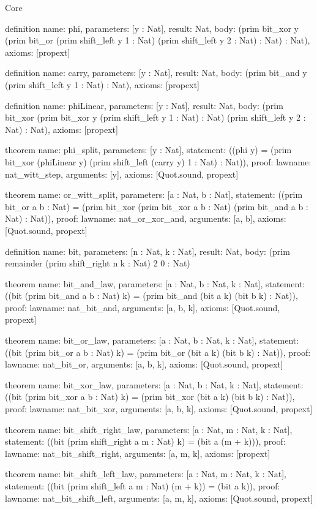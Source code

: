\begin{lexlean}{Core}
\begin{semanticmodule}
definition{
  name: phi,
  parameters: [y : Nat],
  result: Nat,
  body: (prim bit_xor y (prim bit_or (prim shift_left y 1 : Nat) (prim shift_left y 2 : Nat) : Nat) : Nat),
  axioms: [propext]
}

definition{
  name: carry,
  parameters: [y : Nat],
  result: Nat,
  body: (prim bit_and y (prim shift_left y 1 : Nat) : Nat),
  axioms: [propext]
}

definition{
  name: phiLinear,
  parameters: [y : Nat],
  result: Nat,
  body: (prim bit_xor (prim bit_xor y (prim shift_left y 1 : Nat) : Nat) (prim shift_left y 2 : Nat) : Nat),
  axioms: [propext]
}

theorem{
  name: phi_split,
  parameters: [y : Nat],
  statement: ((phi y) = (prim bit_xor (phiLinear y) (prim shift_left (carry y) 1 : Nat) : Nat)),
  proof: law{name: nat_witt_step, arguments: [y]},
  axioms: [Quot.sound, propext]
}

theorem{
  name: or_witt_split,
  parameters: [a : Nat, b : Nat],
  statement: ((prim bit_or a b : Nat) = (prim bit_xor (prim bit_xor a b : Nat) (prim bit_and a b : Nat) : Nat)),
  proof: law{name: nat_or_xor_and, arguments: [a, b]},
  axioms: [Quot.sound, propext]
}

definition{
  name: bit,
  parameters: [n : Nat, k : Nat],
  result: Nat,
  body: (prim remainder (prim shift_right n k : Nat) 2 0 : Nat)
}

theorem{
  name: bit_and_law,
  parameters: [a : Nat, b : Nat, k : Nat],
  statement: ((bit (prim bit_and a b : Nat) k) = (prim bit_and (bit a k) (bit b k) : Nat)),
  proof: law{name: nat_bit_and, arguments: [a, b, k]},
  axioms: [Quot.sound, propext]
}

theorem{
  name: bit_or_law,
  parameters: [a : Nat, b : Nat, k : Nat],
  statement: ((bit (prim bit_or a b : Nat) k) = (prim bit_or (bit a k) (bit b k) : Nat)),
  proof: law{name: nat_bit_or, arguments: [a, b, k]},
  axioms: [Quot.sound, propext]
}

theorem{
  name: bit_xor_law,
  parameters: [a : Nat, b : Nat, k : Nat],
  statement: ((bit (prim bit_xor a b : Nat) k) = (prim bit_xor (bit a k) (bit b k) : Nat)),
  proof: law{name: nat_bit_xor, arguments: [a, b, k]},
  axioms: [Quot.sound, propext]
}

theorem{
  name: bit_shift_right_law,
  parameters: [a : Nat, m : Nat, k : Nat],
  statement: ((bit (prim shift_right a m : Nat) k) = (bit a (m + k))),
  proof: law{name: nat_bit_shift_right, arguments: [a, m, k]},
  axioms: [propext]
}

theorem{
  name: bit_shift_left_law,
  parameters: [a : Nat, m : Nat, k : Nat],
  statement: ((bit (prim shift_left a m : Nat) (m + k)) = (bit a k)),
  proof: law{name: nat_bit_shift_left, arguments: [a, m, k]},
  axioms: [Quot.sound, propext]
}


\end{semanticmodule}
\end{lexlean}
